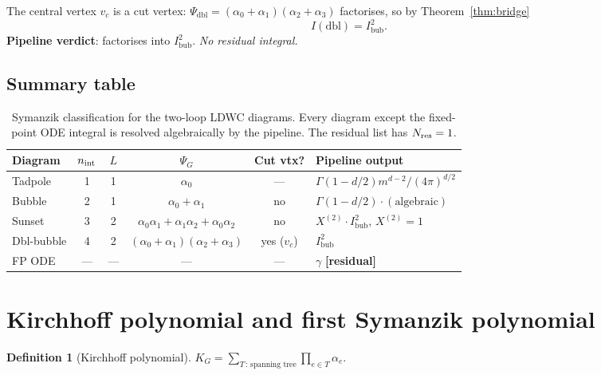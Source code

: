 \documentclass[10pt,a4paper,twocolumn]{article}
\theoremstyle{plain}
\theoremstyle{definition}
\newtheorem{definition}{Definition}
\renewcommand{\Psi}{\varPsi}
\newcommand{\Nres}{N_{\rm res}}
\begin{document}
The central vertex $v_c$ is a cut vertex:
$\Psi_{\text{dbl}} = (\alpha_0+\alpha_1)(\alpha_2+\alpha_3)$
factorises, so by Theorem~\ref{thm:bridge}
\[
  I(\text{dbl}) = I_{\text{bub}}^2.
\]
\textbf{Pipeline verdict}: factorises into $I_{\text{bub}}^2$.
\emph{No residual integral.}

\subsection{Summary table}

\begin{table}[t]
\centering
\begin{tabular}{lccccl}
\toprule
Diagram & $n_{\rm int}$ & $L$ & $\Psi_G$ & Cut vtx? & Pipeline output \\
\midrule
Tadpole     & 1 & 1
  & $\alpha_0$
  & ---
  & $\Gamma(1-d/2)m^{d-2}/(4\pi)^{d/2}$ \\
Bubble      & 2 & 1
  & $\alpha_0+\alpha_1$
  & no
  & $\Gamma(1-d/2)\cdot(\text{algebraic})$ \\
Sunset      & 3 & 2
  & $\alpha_0\alpha_1{+}\alpha_1\alpha_2{+}\alpha_0\alpha_2$
  & no
  & $X^{(2)}\cdot I_{\text{bub}}^2$,\; $X^{(2)}=1$ \\
Dbl-bubble  & 4 & 2
  & $(\alpha_0{+}\alpha_1)(\alpha_2{+}\alpha_3)$
  & yes ($v_c$)
  & $I_{\text{bub}}^2$ \\
\midrule
FP ODE      & ---  & ---
  & ---
  & ---
  & $\gamma$ \quad\textbf{[residual]} \\
\bottomrule
\end{tabular}
\caption{Symanzik classification for the two-loop LDWC diagrams.
  Every diagram except the fixed-point ODE integral is resolved
  algebraically by the pipeline.  The residual list has $\Nres = 1$.}
\label{tab:summary}
\end{table}

\section{Kirchhoff polynomial and first Symanzik polynomial}
\label{sec:kirchhoff}

\begin{definition}[Kirchhoff polynomial]
$K_G = \sum_{T\,:\,\text{spanning tree}} \prod_{e \in T} \alpha_e$.
\end{definition}
\end{document}
